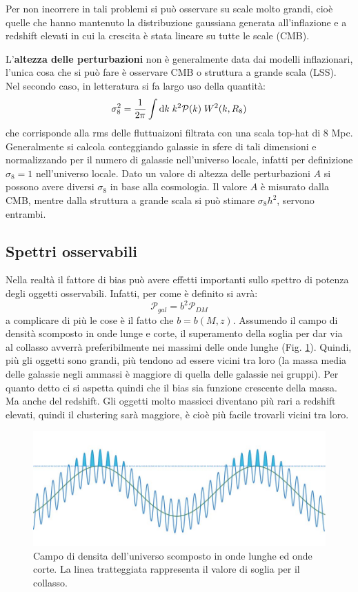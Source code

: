 Per non incorrere in tali problemi si può osservare su scale molto grandi, cioè quelle che hanno mantenuto la distribuzione gaussiana generata all’inflazione e a redshift elevati in cui la crescita è stata lineare su tutte le scale (CMB).

L'\textbf{altezza delle perturbazioni} non è generalmente data dai modelli inflazionari, l'unica cosa che si può fare è osservare CMB o struttura a grande scala (LSS). Nel secondo caso, in letteratura si fa largo uso della quantità:
\begin{equation}
    \sigma_8 ^2 = \frac{1}{2\pi}\int \operatorname{d}\!{k}\; k^2 \mathcal{P}(k)\; W^2(k,R_8)
\end{equation}
che corrisponde alla rms delle fluttuaizoni filtrata con una scala top-hat di $8$ Mpc. Generalmente si calcola conteggiando galassie in sfere di tali dimensioni e normalizzando per il numero di galassie nell'universo locale, infatti per definizione $\sigma_8=1$ nell'universo locale. Dato un valore di altezza delle perturbazioni $A$ si possono avere diversi $\sigma_8$ in base alla cosmologia. Il valore $A$ è misurato dalla CMB, mentre dalla struttura a grande scala si può stimare $\sigma_8 h^2$, servono entrambi.

\subsection{Spettri osservabili}
Nella realtà il fattore di bias può avere effetti importanti sullo spettro di potenza degli oggetti osservabili. Infatti, per come è definito si avrà:
$$ \mathcal{P}_{gal}=b^2\mathcal{P}_{DM} $$
a complicare di più le cose è il fatto che $b=b(M,z)$. Assumendo il campo di densità scomposto in onde lunge e corte, il superamento della soglia per dar via al collasso avverrà preferibilmente nei massimi delle onde lunghe (Fig. \ref{fig8:ultimissima}). Quindi, più gli oggetti sono grandi, più tendono ad essere vicini tra loro (la massa media delle galassie negli ammassi è maggiore di quella delle galassie nei gruppi). Per quanto detto ci si aspetta quindi che il bias sia funzione crescente della massa. Ma anche del redshift. Gli oggetti molto
massicci diventano più rari a redshift elevati, quindi il clustering sarà maggiore, è cioè più facile trovarli vicini tra loro.

\begin{figure}[H]
    \centering
    \includegraphics[width=.8 \textwidth]{Pictures/8/galform.jpg}
    \caption{Campo di densita dell'universo scomposto in onde lunghe ed onde corte. La linea tratteggiata rappresenta il valore di soglia per il collasso.}\label{fig8:ultimissima}
\end{figure}

